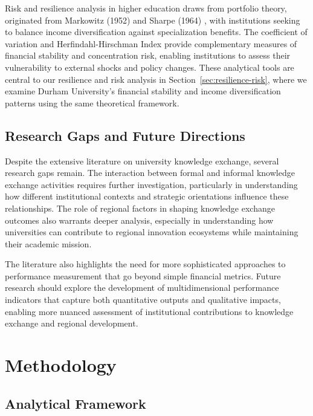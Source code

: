 \documentclass[journal,onecolumn, 10pt,draftclsnofoot]{IEEEtran}
\begin{document}
Risk and resilience analysis in higher education draws from portfolio theory, originated from Markowitz (1952) \cite{markowitz1952portfolio} and Sharpe (1964) \cite{sharpe1964capital}, with institutions seeking to balance income diversification against specialization benefits. The coefficient of variation and Herfindahl-Hirschman Index provide complementary measures of financial stability and concentration risk, enabling institutions to assess their vulnerability to external shocks and policy changes. These analytical tools are central to our resilience and risk analysis in Section~\ref{sec:resilience-risk}, where we examine Durham University's financial stability and income diversification patterns using the same theoretical framework.

\subsection{Research Gaps and Future Directions}

Despite the extensive literature on university knowledge exchange, several research gaps remain. The interaction between formal and informal knowledge exchange activities requires further investigation, particularly in understanding how different institutional contexts and strategic orientations influence these relationships. The role of regional factors in shaping knowledge exchange outcomes also warrants deeper analysis, especially in understanding how universities can contribute to regional innovation ecosystems while maintaining their academic mission.

The literature also highlights the need for more sophisticated approaches to performance measurement that go beyond simple financial metrics. Future research should explore the development of multidimensional performance indicators that capture both quantitative outputs and qualitative impacts, enabling more nuanced assessment of institutional contributions to knowledge exchange and regional development.

\section{Methodology}
\label{sec:methodology}

\subsection{Analytical Framework}
\end{document}
